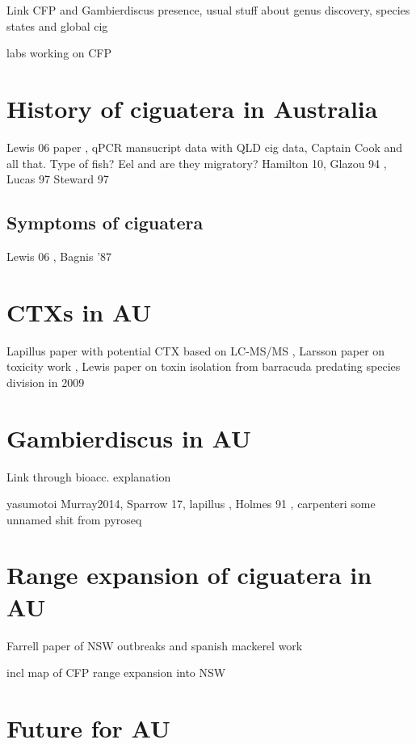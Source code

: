 \documentclass[12pt]{article}
\begin{document}
Link CFP and Gambierdiscus presence, usual stuff about genus discovery, species states and global cig

labs working on CFP

\section*{History of ciguatera in Australia}
Lewis 06 paper \cite{lewis2006ciguatera}, qPCR mansucript data with QLD cig data, Captain Cook and all that. Type of fish? Eel and are they migratory?
Hamilton 10, Glazou 94 \cite{glaziou1994epidemiology}, Lucas 97 \cite{lucas1997pacific} Steward 97

\subsection*{Symptoms of ciguatera}
Lewis 06 \cite{lewis2006ciguatera}, Bagnis '87 \cite{bagnis1987use}

\section*{CTXs in AU}
Lapillus paper with potential CTX based on LC-MS/MS \cite{kretzschmar2017characterization}, Larsson paper on toxicity work \cite{larsson2018toxicology}, Lewis paper on toxin isolation from barracuda predating species division in 2009 \cite{lewis1984ciguatoxin}


\section*{Gambierdiscus in AU}
Link through bioacc. explanation 

yasumotoi Murray2014, Sparrow 17, lapillus \cite{kretzschmar2017characterization}, Holmes 91 \cite{holmes1991strain}, carpenteri \cite{kohli2014high} some unnamed shit from pyroseq \cite{kohli2014cob}

\section*{Range expansion of ciguatera in AU}
Farrell paper of NSW outbreaks \cite{farrellclinical} and spanish mackerel work \cite{kohli2017qualitative}

incl map of CFP range expansion into NSW


\section*{Future for AU}


\newpage


\end{document}
